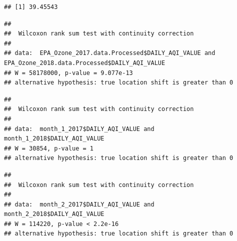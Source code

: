 \documentclass[12pt,]{article}
\newenvironment{Shaded}{\begin{snugshade}}{\end{snugshade}}
\newcommand{\KeywordTok}[1]{\textcolor[rgb]{0.13,0.29,0.53}{\textbf{#1}}}
\newcommand{\DataTypeTok}[1]{\textcolor[rgb]{0.13,0.29,0.53}{#1}}
\newcommand{\DecValTok}[1]{\textcolor[rgb]{0.00,0.00,0.81}{#1}}
\newcommand{\FloatTok}[1]{\textcolor[rgb]{0.00,0.00,0.81}{#1}}
\newcommand{\StringTok}[1]{\textcolor[rgb]{0.31,0.60,0.02}{#1}}
\newcommand{\OperatorTok}[1]{\textcolor[rgb]{0.81,0.36,0.00}{\textbf{#1}}}
\newcommand{\NormalTok}[1]{#1}
\begin{document}
\begin{verbatim}
## [1] 39.45543
\end{verbatim}

\begin{Shaded}
\end{Shaded}

\begin{verbatim}
## 
##  Wilcoxon rank sum test with continuity correction
## 
## data:  EPA_Ozone_2017.data.Processed$DAILY_AQI_VALUE and EPA_Ozone_2018.data.Processed$DAILY_AQI_VALUE
## W = 58178000, p-value = 9.077e-13
## alternative hypothesis: true location shift is greater than 0
\end{verbatim}

\begin{Shaded}
\end{Shaded}

\begin{verbatim}
## 
##  Wilcoxon rank sum test with continuity correction
## 
## data:  month_1_2017$DAILY_AQI_VALUE and month_1_2018$DAILY_AQI_VALUE
## W = 30854, p-value = 1
## alternative hypothesis: true location shift is greater than 0
\end{verbatim}

\begin{Shaded}
\end{Shaded}

\begin{verbatim}
## 
##  Wilcoxon rank sum test with continuity correction
## 
## data:  month_2_2017$DAILY_AQI_VALUE and month_2_2018$DAILY_AQI_VALUE
## W = 114220, p-value < 2.2e-16
## alternative hypothesis: true location shift is greater than 0
\end{verbatim}
\end{document}
